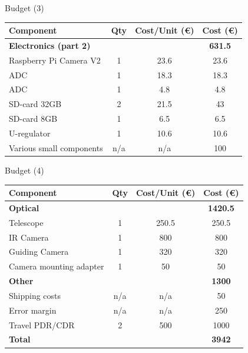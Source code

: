 \documentclass[11pt, aspectratio=169]{beamer}
\begin{document}
\begin{frame}{Budget (3)}
    \centering
    \begin{tabular}{|l|c|c|c|} 
        \hline
        Component & Qty & Cost/Unit (\euro) & Cost (\euro)  \\ 
        \hline
        \rowcolor{Gray}
        \textbf{Electronics (part 2)} &  &  & \textbf{631.5}  \\ 
        Raspberry Pi Camera V2 & 1 & 23.6 & 23.6  \\ 
        ADC & 1 & 18.3 & 18.3  \\ 
        ADC & 1 & 4.8 & 4.8  \\
        SD-card 32GB & 2 & 21.5 & 43  \\
        SD-card 8GB & 1 & 6.5 & 6.5  \\
        U-regulator & 1 & 10.6 & 10.6  \\
        Various small components & n/a & n/a & 100  \\
        \hline
    \end{tabular}
\end{frame}
\begin{frame}{Budget (4)}
    \centering
    \begin{tabular}{|l|c|c|c|} 
        \hline
        Component & Qty & Cost/Unit (\euro) & Cost (\euro)  \\ 
        \hline
        \rowcolor{Gray}
        \textbf{Optical} &  &  & \textbf{1420.5}  \\
        Telescope & 1 & 250.5 & 250.5  \\
        IR Camera & 1 & 800 & 800  \\
        Guiding Camera & 1 & 320 & 320  \\
        Camera mounting adapter & 1 & 50 & 50 \\
        \hline
        \rowcolor{Gray}
        \textbf{Other} &  &  & \textbf{1300}  \\
        Shipping costs & n/a & n/a & 50  \\
        Error margin & n/a & n/a & 250  \\
        Travel PDR/CDR & 2 & 500 & 1000 \\
        \hline
        \textbf{Total} &  &  & \textbf{3942}  \\
        \hline
    \end{tabular}
\end{frame}
\end{document}
